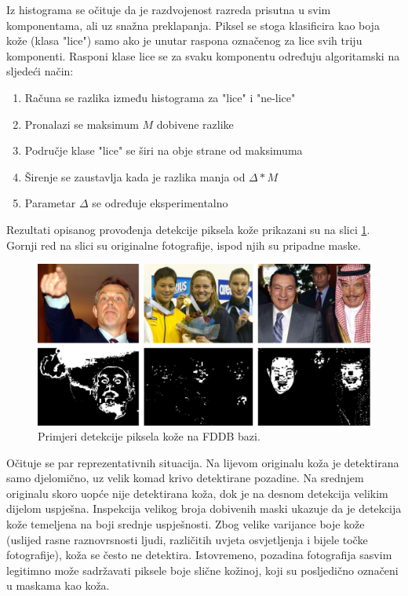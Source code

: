\documentclass[times, utf8, seminar, numeric]{fer}
\begin{document}
Iz histograma se očituje da je razdvojenost razreda prisutna u svim komponentama, ali
uz snažna preklapanja. Piksel se stoga klasificira kao boja kože (klasa "lice") samo
ako je unutar raspona označenog za lice svih triju komponenti. Rasponi klase lice se
za svaku komponentu određuju algoritamski na sljedeći način:

\begin{enumerate}
  \item{Računa se razlika između histograma za "lice" i "ne-lice"}
  \item{Pronalazi se maksimum $M$ dobivene razlike}
  \item{Područje klase "lice" se širi na obje strane od maksimuma}
  \item{Širenje se zaustavlja kada je razlika manja od $\Delta * M$}
  \item{Parametar $\Delta$ se određuje eksperimentalno}
\end{enumerate}

Rezultati opisanog provođenja detekcije piksela kože prikazani su na slici \ref{fig:fddb_masks}.
Gornji red na slici su originalne fotografije, ispod njih su pripadne maske.

\begin{figure}[!htb]
\centering
\includegraphics[width=\textwidth]{raw/fddb_masks.jpg}
\caption{Primjeri detekcije piksela kože na FDDB bazi.}
\label{fig:fddb_masks}
\end{figure}

Očituje se par
reprezentativnih situacija. Na lijevom originalu koža je detektirana samo djelomično, uz
velik komad krivo detektirane pozadine. Na srednjem originalu skoro uopće nije detektirana
koža, dok je na desnom detekcija velikim dijelom uspješna. Inspekcija velikog broja dobivenih
maski ukazuje da je detekcija kože temeljena na boji srednje uspješnosti. Zbog velike varijance
boje kože (uslijed rasne raznovrsnosti ljudi, različitih uvjeta osvjetljenja i bijele točke
fotografije), koža se često ne detektira. Istovremeno, pozadina fotografija sasvim legitimno
može sadržavati piksele boje slične kožinoj, koji su posljedično označeni u maskama kao koža.
\end{document}
